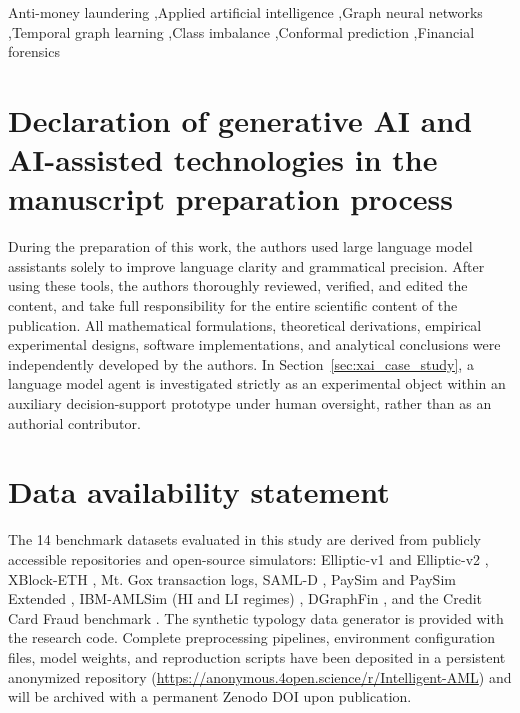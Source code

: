 \documentclass[a4paper,fleqn]{cas-dc}
\begin{document}
\begin{keywords}
Anti-money laundering \sep Applied artificial intelligence \sep Graph neural networks \sep Temporal graph learning \sep Class imbalance \sep Conformal prediction \sep Financial forensics
\end{keywords}

\maketitle
\linenumbers










\FloatBarrier
\section*{Declaration of generative AI and AI-assisted technologies in the manuscript preparation process}
During the preparation of this work, the authors used large language model assistants solely to improve language clarity and grammatical precision. After using these tools, the authors thoroughly reviewed, verified, and edited the content, and take full responsibility for the entire scientific content of the publication. All mathematical formulations, theoretical derivations, empirical experimental designs, software implementations, and analytical conclusions were independently developed by the authors. In Section~\ref{sec:xai_case_study}, a language model agent is investigated strictly as an experimental object within an auxiliary decision-support prototype under human oversight, rather than as an authorial contributor.

\section*{Data availability statement}
The 14 benchmark datasets evaluated in this study are derived from publicly accessible repositories and open-source simulators: Elliptic-v1 and Elliptic-v2 \citep{weber2019anti, bellei2024elliptic2}, XBlock-ETH \citep{zheng2020xblock}, Mt. Gox transaction logs, SAML-D \citep{lorenz2020samld}, PaySim and PaySim Extended \citep{lopez2016paysim}, IBM-AMLSim (HI and LI regimes) \citep{suzumura2019amlsim}, DGraphFin \citep{dgraphfin}, and the Credit Card Fraud benchmark \citep{dalpozzolo2018credit}. The synthetic typology data generator is provided with the research code. Complete preprocessing pipelines, environment configuration files, model weights, and reproduction scripts have been deposited in a persistent anonymized repository (\url{https://anonymous.4open.science/r/Intelligent-AML}) and will be archived with a permanent Zenodo DOI upon publication.



\end{document}
